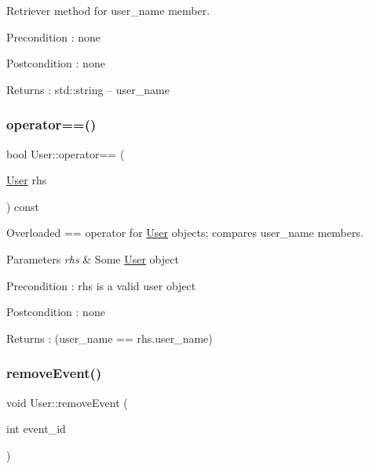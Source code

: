 Retriever method for user\+\_\+name member. \begin{DoxyPrecond}{Precondition}
\+: none 
\end{DoxyPrecond}
\begin{DoxyPostcond}{Postcondition}
\+: none 
\end{DoxyPostcond}
\begin{DoxyReturn}{Returns}
\+: std\+::string -- user\+\_\+name 
\end{DoxyReturn}
\mbox{\label{class_user_a0a703687045c47c1b3375a53e0a2f572}} 
\subsubsection{\texorpdfstring{operator==()}{operator==()}}
{\footnotesize\ttfamily bool User\+::operator== (\begin{DoxyParamCaption}\item[{\mbox{\hyperlink{class_user}{User}}}]{rhs }\end{DoxyParamCaption}) const}

Overloaded == operator for \mbox{\hyperlink{class_user}{User}} objects; compares user\+\_\+name members. 
\begin{DoxyParams}{Parameters}
{\em rhs} & Some \mbox{\hyperlink{class_user}{User}} object \\
\hline
\end{DoxyParams}
\begin{DoxyPrecond}{Precondition}
\+: rhs is a valid user object 
\end{DoxyPrecond}
\begin{DoxyPostcond}{Postcondition}
\+: none 
\end{DoxyPostcond}
\begin{DoxyReturn}{Returns}
\+: (user\+\_\+name == rhs.\+user\+\_\+name) 
\end{DoxyReturn}
\mbox{\label{class_user_aa6e7e42777a61cb2c6202c3314e4bde3}} 
\subsubsection{\texorpdfstring{remove\+Event()}{removeEvent()}}
{\footnotesize\ttfamily void User\+::remove\+Event (\begin{DoxyParamCaption}\item[{int}]{event\+\_\+id }\end{DoxyParamCaption})}

